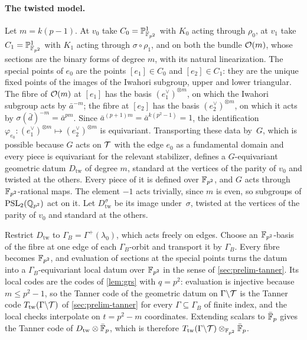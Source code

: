 \paragraph{The twisted model.} Let $m=k(p-1)$. At $v_0$ take $C_0=\mathbb{P}^1_{\mathbb{F}_{p^2}}$ with $K_0$ acting through $\rho_0$, at
$v_1$ take $C_1=\mathbb{P}^1_{\mathbb{F}_{p^2}}$ with $K_1$ acting through $\sigma\circ\rho_1$, and on both the bundle $\mathcal{O}(m)$, whose
sections are the binary forms of degree $m$, with its natural linearization. The special points of $e_0$ are the points
$[e_1]\in C_0$ and $[e_2]\in C_1$: they are the unique fixed points of the images of the Iwahori subgroup, upper and lower
triangular. The fibre of $\mathcal{O}(m)$ at $[e_1]$ has the basis $(e_1^\vee)^{\otimes m}$, on which the Iwahori subgroup acts by
$\bar a^{-m}$; the fibre at $[e_2]$ has the basis $(e_2^\vee)^{\otimes m}$, on which it acts by $\sigma(\bar d)^{-m}=\bar a^{pm}$.
Since $\bar a^{(p+1)m}=\bar a^{k(p^2-1)}=1$, the identification
$\varphi_{e_0}\colon(e_1^\vee)^{\otimes m}\mapsto(e_2^\vee)^{\otimes m}$ is equivariant. Transporting these data by~$G$, which
is possible because $G$ acts on $\mathcal{T}$ with the edge $e_0$ as a fundamental domain and every piece is equivariant for the
relevant stabilizer, defines a $G$-equivariant geometric datum $D_{\mathrm{tw}}$ of degree $m$, standard at the vertices
of the parity of $v_0$ and twisted at the others. Every piece of it is defined over $\mathbb{F}_{p^2}$, and $G$ acts through
$\mathbb{F}_{p^2}$-rational maps. The element $-1$ acts trivially, since $m$ is even, so subgroups of $\operatorname{PSL}_2(\mathbb{Q}_{p^2})$ act on it.
Let $D^\sigma_{\mathrm{tw}}$ be its image under~$\sigma$, twisted at the vertices of the parity of $v_0$ and standard at the
others.

Restrict $D_{\mathrm{tw}}$ to $\Gamma_B=\Gamma^+(\lambda_0)$, which acts freely on edges. Choose an $\mathbb{F}_{p^2}$-basis of the
fibre at one edge of each $\Gamma_B$-orbit and transport it by $\Gamma_B$. Every fibre becomes $\mathbb{F}_{p^2}$, and evaluation of
sections at the special points turns the datum into a $\Gamma_B$-equivariant local datum over $\mathbb{F}_{p^2}$ in the sense of
\cref{sec:prelim-tanner}. Its local codes are the codes of \cref{lem:grs} with $q=p^2$: evaluation is injective because
$m\le p^2-1$, so the Tanner code of the geometric datum on $\Gamma\backslash\mathcal{T}$ is the Tanner code $T_{\mathrm{tw}}(\Gamma\backslash\mathcal{T})$
of \cref{sec:prelim-tanner} for every $\Gamma\subseteq\Gamma_B$ of finite index, and the local checks interpolate on
$t=p^2-m$ coordinates. Extending scalars to $\bar{\mathbb{F}}_p$ gives the Tanner code of $D_{\mathrm{tw}}\otimes\bar{\mathbb{F}}_p$, which is
therefore $T_{\mathrm{tw}}(\Gamma\backslash\mathcal{T})\otimes_{\mathbb{F}_{p^2}}\bar{\mathbb{F}}_p$.

